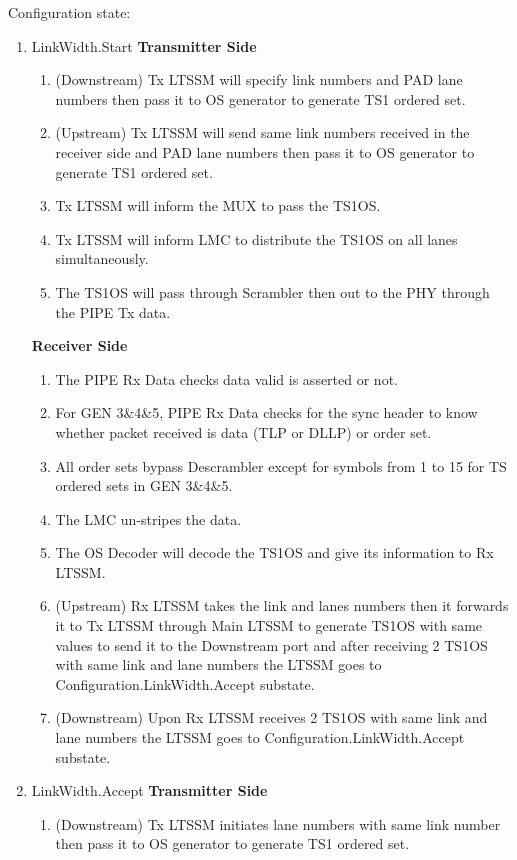 Configuration state:\newline
\begin{enumerate}
\item LinkWidth.Start
\newline\textbf{Transmitter Side}
 \begin{enumerate}
  \item (Downstream) Tx LTSSM will specify link numbers and PAD lane numbers then pass it to OS generator to generate TS1 ordered set.
  \item (Upstream) Tx LTSSM will send same link numbers received in the receiver side and PAD lane numbers then pass it to OS generator to generate TS1 ordered set.
  \item Tx LTSSM will inform the MUX to pass the TS1OS.
  \item Tx LTSSM will inform LMC to distribute the TS1OS on all lanes simultaneously.
  \item The TS1OS will pass through Scrambler then out to the PHY through the PIPE Tx data.
\end{enumerate}
\textbf{Receiver Side}
\begin{enumerate}
  \item The PIPE Rx Data checks data valid is asserted or not.
  \item For GEN 3\&4\&5, PIPE Rx Data checks for the sync header to know whether packet received is data (TLP or DLLP) or order set.
  \item All order sets bypass Descrambler except for symbols from 1 to 15 for TS ordered sets in GEN 3\&4\&5.
  \item The LMC un-stripes the data.
  \item The OS Decoder will decode the TS1OS and give its information to Rx LTSSM.
  \item (Upstream) Rx LTSSM takes the link and lanes numbers then it forwards it to Tx LTSSM through Main LTSSM to generate TS1OS with same values to send it to the Downstream port and after receiving 2 TS1OS with same link and lane numbers the LTSSM goes to Configuration.LinkWidth.Accept substate.
  \item (Downstream) Upon Rx LTSSM receives 2 TS1OS with same link and lane numbers the LTSSM goes to Configuration.LinkWidth.Accept substate.
\end{enumerate}
\item LinkWidth.Accept
\newline\textbf{Transmitter Side}
\begin{enumerate}
  \item (Downstream) Tx LTSSM initiates lane numbers with same link number then pass it to OS generator to generate TS1 ordered set.

\end{enumerate}
\end{enumerate}
